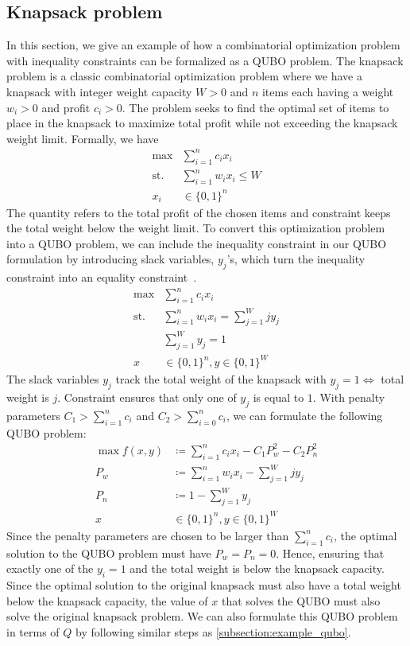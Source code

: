 \subsection{Knapsack problem}
In this section, we give an example of how a combinatorial optimization problem with inequality constraints can be formalized as a QUBO problem. The knapsack problem is a classic combinatorial optimization problem where we have a knapsack with integer weight capacity $W > 0$ and $n$ items each having a weight $w_i > 0$ and profit $c_i > 0$. The problem seeks to find the optimal set of items to place in the knapsack to maximize total profit while not exceeding the knapsack weight limit. Formally, we have
\begin{align}
\max &\sum_{i=1}^n c_i x_i \label{eq:knapsack_cost}\\
\mathrm{st.} &\sum_{i=1}^n w_i x_i \leq W \label{eq:knapsack_constraint}\\
x_i &\in \{0,1\}^n \nonumber
\end{align}
The quantity  refers to the total profit of the chosen items and constraint  keeps the total weight below the weight limit. To convert this optimization problem into a QUBO problem, we can include the inequality constraint in our QUBO formulation by introducing slack variables, $y_j$'s, which turn the inequality constraint into an equality constraint~\cite{b6}.
\begin{align}
\max &\sum_{i=1}^n c_i x_i \\
\mathrm{st.} &\sum_{i=1}^n w_i x_i = \sum_{j=1}^W jy_j \label{eq:knapsack_slack_weight}\\
&\sum_{j=1}^W y_j = 1 \label{eq:knapsack_slack_sum}\\
x &\in \{0,1\}^n, y \in \{0,1\}^W \nonumber
\end{align}
The slack variables $y_j$ track the total weight of the knapsack with $y_j = 1 \Leftrightarrow$ total weight is $j$. Constraint  ensures that only one of $y_j$ is equal to $1$. With penalty parameters $C_1 > \sum_{i=1}^n c_i$ and $C_2 > \sum_{i=0}^n c_i$, we can formulate the following QUBO problem:
\begin{align}
    \max f(x, y) &\coloneqq \sum_{i=1}^n c_i x_i - C_1 P_w^2 - C_2 P_n^2 \\
    P_w &\coloneqq \sum_{i=1}^n w_i x_i - \sum_{j=1}^W jy_j \\
    P_n &\coloneqq 1 - \sum_{j=1}^W y_j \\
    x &\in \{0,1\}^n, y \in \{0,1\}^W \nonumber
\end{align}
Since the penalty parameters are chosen to be larger than $\sum_{i=1}^n c_i$, the optimal solution to the QUBO problem must have $P_w = P_n = 0$. Hence, ensuring that exactly one of the $y_i=1$ and the total weight is below the knapsack capacity. Since the optimal solution to the original knapsack must also have a total weight below the knapsack capacity, the value of $x$ that solves the QUBO must also solve the original knapsack problem. We can also formulate this QUBO problem in terms of $Q$ by following similar steps as \autoref{subsection:example_qubo}.

